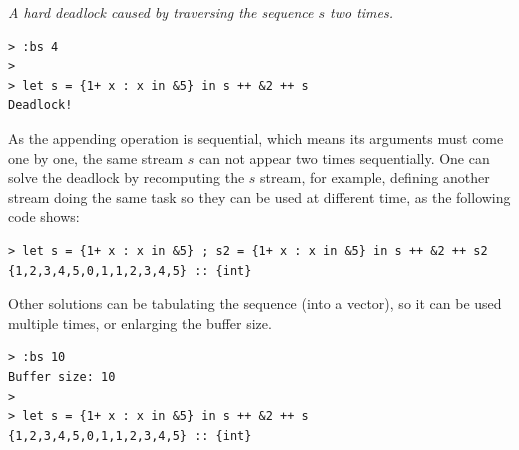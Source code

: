 \begin{itemize}
\begin{example} \emph{A hard deadlock caused by traversing the sequence $s$ two times.} \label{eg:deadlock1}
\end{example}
\begin{lstlisting}[style=nesl-style]
> :bs 4
>
> let s = {1+ x : x in &5} in s ++ &2 ++ s
Deadlock!
\end{lstlisting}
As the appending operation is sequential, which means its arguments must come one by one, the same stream $s$ can not appear two times sequentially.
One can solve the deadlock by recomputing the $s$ stream, for example,  defining another stream doing the same task so they can be used at different time, as the following code shows:\\
\begin{lstlisting}[style=nesl-style]
> let s = {1+ x : x in &5} ; s2 = {1+ x : x in &5} in s ++ &2 ++ s2
{1,2,3,4,5,0,1,1,2,3,4,5} :: {int}
\end{lstlisting}

Other solutions can be tabulating the sequence (into a vector), so it can be used multiple times, or enlarging the buffer size. \\

\begin{lstlisting}[style=nesl-style]
> :bs 10
Buffer size: 10
>
> let s = {1+ x : x in &5} in s ++ &2 ++ s
{1,2,3,4,5,0,1,1,2,3,4,5} :: {int}
\end{lstlisting}
%
% 
%
%  
%
%
%


\end{itemize}



